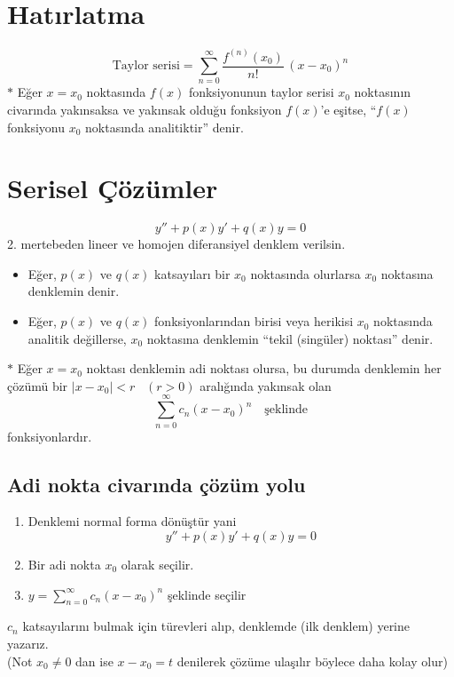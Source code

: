 \documentclass[11pt,a4paper]{article}
\begin{document}
\section{Hatırlatma}
\[ \text{Taylor serisi} = \sum_{n=0}^{\infty} \frac{f^{(n)}(x_0)}{n!}\,(x-x_0)^n \]
$\ast$ Eğer $x=x_0$ noktasında $f(x)$ fonksiyonunun taylor serisi $x_0$ noktasının civarında yakınsaksa ve yakınsak olduğu fonksiyon $f(x)$'e eşitse, ``$f(x)$ fonksiyonu $x_0$ noktasında analitiktir'' denir.

\section{Serisel Çözümler}
\[ y'' + p(x)y' + q(x)y = 0 \]
2. mertebeden lineer ve homojen diferansiyel denklem verilsin.
\begin{itemize}[label=--]
\item Eğer, $p(x)$ ve $q(x)$ katsayıları bir $x_0$ noktasında  olurlarsa $x_0$ noktasına denklemin  denir.
\item Eğer, $p(x)$ ve $q(x)$ fonksiyonlarından birisi veya herikisi $x_0$ noktasında analitik değillerse, $x_0$ noktasına denklemin ``tekil (singüler) noktası'' denir.
\end{itemize}

$\ast$ Eğer $x=x_0$ noktası denklemin adi noktası olursa, bu durumda denklemin her çözümü bir $|x-x_0|<r$ \ $(r>0)$ aralığında yakınsak olan
\[ \sum_{n=0}^{\infty} c_n(x-x_0)^n \quad \text{şeklinde} \]
fonksiyonlardır.

\subsection{Adi nokta civarında çözüm yolu}
\begin{enumerate}[label=\arabic*.]
\item Denklemi normal forma dönüştür yani
\[ y'' + p(x)y' + q(x)y = 0 \]
\item Bir adi nokta $x_0$ olarak seçilir.
\item $\displaystyle y = \sum_{n=0}^{\infty} c_n(x-x_0)^n$ şeklinde seçilir
\end{enumerate}
$c_n$ katsayılarını bulmak için türevleri alıp, denklemde (ilk denklem) yerine yazarız.\\
(Not $x_0\neq 0$ dan ise $x-x_0=t$ denilerek çözüme ulaşılır böylece daha kolay olur)
\end{document}
